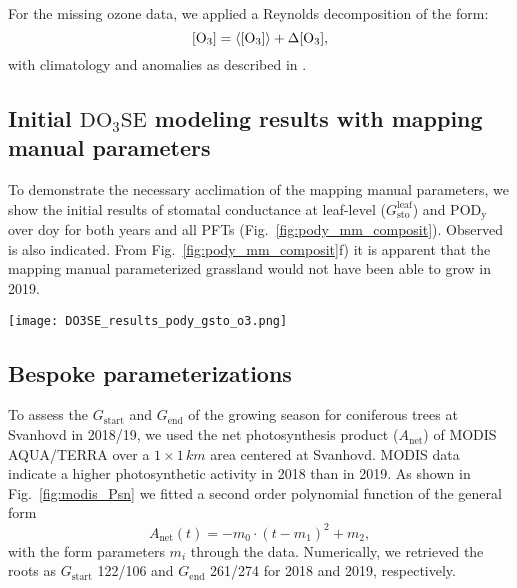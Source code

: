 \documentclass[bg, manuscript]{copernicus}
\begin{document}
For the missing ozone data, we applied a Reynolds decomposition of the form:
\begin{equation}
  \chem{[O_3]} = \chem{\left<[O_3]\right>} + \chem{\Delta[O_3]},
  \label{eq:reynolds_decomp}
\end{equation}
with climatology \chem{\left<[O_3]\right>} and anomalies \chem{\Delta[O_3]} as described in \citet{ACPD:Falk2021}.

\subsection{Initial $\mathrm{DO_3SE}$ modeling results with mapping manual parameters}
To demonstrate the necessary acclimation of the mapping manual parameters, we show the initial results of stomatal conductance at leaf-level ($G_\mathrm{sto}^\mathrm{leaf}$) and $\mathrm{POD_y}$ over \unit{doy} for both years and all PFTs (Fig.~\ref{fig:pody_mm_composit}). Observed \chem{[O_3]} is also indicated. From Fig.~\ref{fig:pody_mm_composit}f) it is apparent that the mapping manual parameterized grassland would not have been able to grow in 2019.

\begin{figure*}[t]
  \texttt{[image: DO3SE\_results\_pody\_gsto\_o3.png]}
  \caption{$\mathrm{DO_3SE}$ modeling results for mapping manual default parameterization. $\mathrm{POD_y}$ is shown over day of year (\unit{doy}), March--October. A flux threshold $y=1\,\unit{nmol\,m^{-2}\,s^{-1}}$ per projected leaf area (PLA) has been chosen. \chem{[O_3]} are plotted on the same axis and scales as $G_\text{sto}^\text{leaf}$ but in units of $\unit{ppb}$. (a, b) deciduous tree; (c, d) coniferous tree; (e, f) perennial grassland. From left to right: 2018, 2019.}
  \label{fig:pody_mm_composit}
\end{figure*}

\subsection{Bespoke parameterizations}

To assess the $G_\mathrm{start}$  and $G_\mathrm{end}$ of the growing season for coniferous trees at Svanhovd in 2018/19, we used the net photosynthesis product ($A_\mathrm{net}$) of MODIS AQUA/TERRA over a $1\times 1\,\unit{km}$ area centered at Svanhovd. MODIS data indicate a higher photosynthetic activity in 2018 than in 2019. As shown in Fig.~\ref{fig:modis_Psn} we fitted a second order polynomial function of the general form
%
\begin{equation}
A_\mathrm{net}(t) =  -m_0\cdot(t-m_1)^2+m_2,
\end{equation}
%
with the form parameters $m_i$ through the data. Numerically, we retrieved the roots as $G_\mathrm{start}$ 122/106 and $G_\mathrm{end}$ 261/274 for 2018 and 2019, respectively. 
\end{document}
